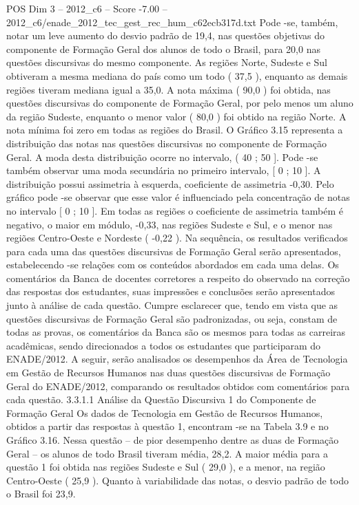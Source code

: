 \begin{textsample}{POS Dim 3 – 2012\_c6 – Score -7.00 – 2012\_c6/enade\_2012\_tec\_gest\_rec\_hum\_c62ecb317d.txt}
Pode -se, também, notar um leve aumento do desvio padrão de 19,4, nas questões objetivas do componente de Formação Geral dos alunos de todo o Brasil, para 20,0 nas questões discursivas do mesmo componente.
As regiões Norte, Sudeste e Sul obtiveram a mesma mediana do país como um todo ( 37,5 ), enquanto as demais regiões tiveram mediana igual a 35,0.
A nota máxima ( 90,0 ) foi obtida, nas questões discursivas do componente de Formação Geral, por pelo menos um aluno da região Sudeste, enquanto o menor valor ( 80,0 ) foi obtido na região Norte.
A nota mínima foi zero em todas as regiões do Brasil.
O Gráfico 3.15 representa a distribuição das notas nas questões discursivas no componente de Formação Geral.
A moda desta distribuição ocorre no intervalo, ( 40 ; 50 ].
Pode -se também observar uma moda secundária no primeiro intervalo, [ 0 ; 10 ].
A distribuição possui assimetria à esquerda, coeficiente de assimetria -0,30.
Pelo gráfico pode -se observar que esse valor é influenciado pela concentração de notas no intervalo [ 0 ; 10 ].
Em todas as regiões o coeficiente de assimetria também é negativo, o maior em módulo, -0,33, nas regiões Sudeste e Sul, e o menor nas regiões Centro-Oeste e Nordeste ( -0,22 ).
Na sequência, os resultados verificados para cada uma das questões discursivas de Formação Geral serão apresentados, estabelecendo -se relações com os conteúdos abordados em cada uma delas.
Os comentários da Banca de docentes corretores a respeito do observado na correção das respostas dos estudantes, suas impressões e conclusões serão apresentados junto à análise de cada questão.
Cumpre esclarecer que, tendo em vista que as questões discursivas de Formação Geral são padronizadas, ou seja, constam de todas as provas, os comentários da Banca são os mesmos para todas as carreiras acadêmicas, sendo direcionados a todos os estudantes que participaram do ENADE/2012.
A seguir, serão analisados os desempenhos da Área de Tecnologia em Gestão de Recursos Humanos nas duas questões discursivas de Formação Geral do ENADE/2012, comparando os resultados obtidos com comentários para cada questão. 3.3.1.1 Análise da Questão Discursiva 1 do Componente de Formação Geral Os dados de Tecnologia em Gestão de Recursos Humanos, obtidos a partir das respostas à questão 1, encontram -se na Tabela 3.9 e no Gráfico 3.16.
Nessa questão – de pior desempenho dentre as duas de Formação Geral – os alunos de todo Brasil tiveram média, 28,2.
A maior média para a questão 1 foi obtida nas regiões Sudeste e Sul ( 29,0 ), e a menor, na região Centro-Oeste ( 25,9 ).
Quanto à variabilidade das notas, o desvio padrão de todo o Brasil foi 23,9.

\end{textsample}
